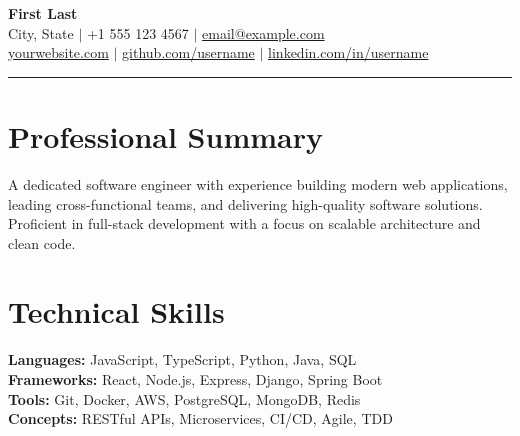 \documentclass[10pt,A4]{article}
\begin{document}

\begin{center}
{\LARGE \textbf{First Last}} \\[6pt]
City, State  $\mid$  +1 555 123 4567  $\mid$  \href{mailto:email@example.com}{email@example.com} \\[2pt]
\href{https://yourwebsite.com}{yourwebsite.com}  $\mid$  \href{https://github.com/username}{github.com/username}  $\mid$  \href{https://linkedin.com/in/username}{linkedin.com/in/username}
\end{center}

\rule{\textwidth}{0.5pt}


\section*{Professional Summary}

A dedicated software engineer with experience building modern web applications, leading cross-functional teams, and delivering high-quality software solutions. Proficient in full-stack development with a focus on scalable architecture and clean code.


\section*{Technical Skills}

\textbf{Languages:} JavaScript, TypeScript, Python, Java, SQL \\
\textbf{Frameworks:} React, Node.js, Express, Django, Spring Boot \\
\textbf{Tools:} Git, Docker, AWS, PostgreSQL, MongoDB, Redis \\
\textbf{Concepts:} RESTful APIs, Microservices, CI/CD, Agile, TDD

\end{document}
